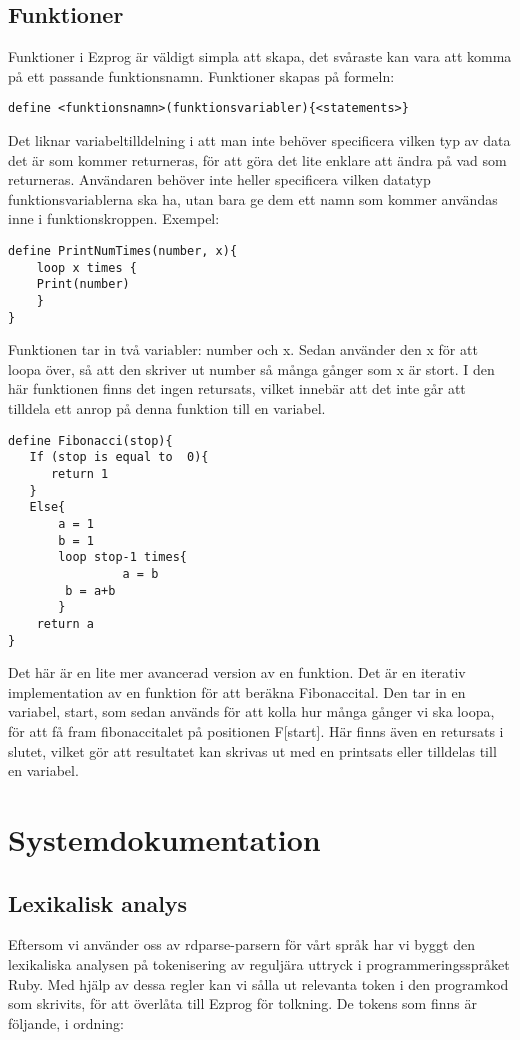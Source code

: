 \documentclass{TDP003mall}
\begin{document}
{\subsection{Funktioner}
Funktioner i Ezprog är väldigt simpla att skapa, det svåraste kan vara att komma på ett passande funktionsnamn. Funktioner skapas på formeln:
\begin{lstlisting}
define <funktionsnamn>(funktionsvariabler){<statements>}
\end{lstlisting}
Det liknar variabeltilldelning i att man inte behöver specificera vilken typ av data det är som kommer returneras, för att göra det lite enklare att ändra på vad som returneras. Användaren behöver inte heller specificera vilken datatyp funktionsvariablerna ska ha, utan bara ge dem ett namn som kommer användas inne i funktionskroppen.
Exempel:
\begin{lstlisting}
define PrintNumTimes(number, x){
    loop x times {
    Print(number)
    }
}
\end{lstlisting}
Funktionen tar in två variabler: number och x. Sedan använder den x för att loopa över, så att den skriver ut number så många gånger som x är stort. I den här funktionen finns det ingen retursats, vilket innebär att det inte går att tilldela ett anrop på denna funktion till en variabel.
\begin{lstlisting}
define Fibonacci(stop){
   If (stop is equal to  0){
      return 1
   }
   Else{
       a = 1
       b = 1
       loop stop-1 times{
                a = b
        b = a+b
       }
    return a
}
\end{lstlisting}

Det här är en lite mer avancerad version av en funktion. Det är en iterativ implementation av en funktion för att beräkna Fibonaccital. Den tar in en variabel, start, som sedan används för att kolla hur många gånger vi ska loopa, för att få fram fibonaccitalet på positionen F[start]. Här finns även en retursats i slutet, vilket gör att resultatet kan skrivas ut med en printsats eller tilldelas till en variabel.
\clearpage 
\section{Systemdokumentation}
\subsection{Lexikalisk analys}
Eftersom vi använder oss av rdparse-parsern för vårt språk har vi byggt den lexikaliska analysen på tokenisering av reguljära uttryck i programmeringsspråket Ruby. Med hjälp av dessa regler kan vi sålla ut relevanta token i den programkod som skrivits, för att överlåta till Ezprog för tolkning. De tokens som finns är följande, i ordning:

}
\end{document}
